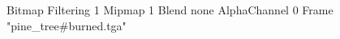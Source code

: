 {Bitmap
	{Filtering 1}
	{Mipmap 1}
	{Blend none}
	{AlphaChannel 0}
	{Frame "pine_tree#burned.tga"}
}
